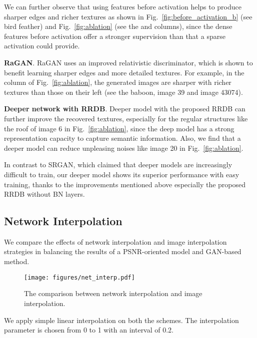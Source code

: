 \documentclass[runningheads]{llncs}
\begin{document}
We can further observe that using features before activation helps to produce sharper edges and richer textures as 
shown in Fig.~\ref{fig:before_activation_b} (see bird feather) and Fig.~\ref{fig:ablation} (see the  and 
 columns), since the dense features before activation offer a stronger supervision than that a sparse 
activation could provide.

\noindent \textbf{RaGAN}. RaGAN uses an improved relativistic discriminator, which is shown to benefit learning 
sharper edges and more detailed textures. 
For example, in the  column of Fig.~\ref{fig:ablation}, the generated images are sharper with richer textures 
than those on their left (see the baboon, image 39 and image 43074).

\noindent \textbf{Deeper network with RRDB}.
Deeper model with the proposed RRDB can further improve the recovered textures, especially for the regular structures  
like the roof of image 6 in Fig.~\ref{fig:ablation}, since the deep model has a strong representation capacity to 
capture semantic information. 
Also, we find that a deeper model can reduce unpleasing noises like image 20 in Fig.~\ref{fig:ablation}.

In contrast to SRGAN, which claimed that deeper models are increasingly difficult to train, our deeper model  
shows its superior performance with easy training, thanks to the improvements mentioned above especially the proposed 
RRDB without BN layers.

\subsection{Network Interpolation} \label{subsec:exp_net_interp}

We compare the effects of network interpolation and image interpolation strategies in balancing the results of a 
PSNR-oriented model and GAN-based method.
\begin{figure}[htb]
	\begin{center}
		\texttt{[image: figures/net\_interp.pdf]}
	\end{center}
	\vspace{-0.4cm}
	\caption{The comparison between network interpolation and image interpolation.}
	\label{fig:net_interp}
	\vspace{-0.4cm}
\end{figure}
We apply simple linear interpolation on both the schemes.
The interpolation parameter  is chosen from 0 to 1 with an interval of 0.2. 
\end{document}
